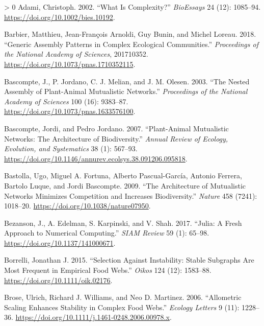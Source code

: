 \documentclass[11pt]{article}
\newlength{\cslhangindent}
\newenvironment{CSLReferences}[3] %
 {%
  \setlength{\parindent}{0pt}
  \ifodd #1 \everypar{\setlength{\hangindent}{\cslhangindent}}\ignorespaces\fi
  \ifnum #2 > 0
  \setlength{\parskip}{#2\baselineskip}
  \fi
 }%
 {}
\begin{document}
\hypertarget{refs}{}
\begin{CSLReferences}{1}{0}
\leavevmode\hypertarget{ref-Adami2002WhaCom}{}%
Adami, Christoph. 2002. {``What Is Complexity?''} \emph{BioEssays} 24
(12): 1085--94. \url{https://doi.org/10.1002/bies.10192}.

\leavevmode\hypertarget{ref-Barbier2018GenAss}{}%
Barbier, Matthieu, Jean-François Arnoldi, Guy Bunin, and Michel Loreau.
2018. {``Generic Assembly Patterns in Complex Ecological Communities.''}
\emph{Proceedings of the National Academy of Sciences}, 201710352.
\url{https://doi.org/10.1073/pnas.1710352115}.

\leavevmode\hypertarget{ref-Bascompte2003NesAss}{}%
Bascompte, J., P. Jordano, C. J. Melian, and J. M. Olesen. 2003. {``The
Nested Assembly of Plant-Animal Mutualistic Networks.''}
\emph{Proceedings of the National Academy of Sciences} 100 (16):
9383--87. \url{https://doi.org/10.1073/pnas.1633576100}.

\leavevmode\hypertarget{ref-Bascompte2007PlaMut}{}%
Bascompte, Jordi, and Pedro Jordano. 2007. {``Plant-Animal Mutualistic
Networks: The Architecture of Biodiversity.''} \emph{Annual Review of
Ecology, Evolution, and Systematics} 38 (1): 567--93.
\url{https://doi.org/10.1146/annurev.ecolsys.38.091206.095818}.

\leavevmode\hypertarget{ref-Bastolla2009ArcMut}{}%
Bastolla, Ugo, Miguel A. Fortuna, Alberto Pascual-García, Antonio
Ferrera, Bartolo Luque, and Jordi Bascompte. 2009. {``The Architecture
of Mutualistic Networks Minimizes Competition and Increases
Biodiversity.''} \emph{Nature} 458 (7241): 1018--20.
\url{https://doi.org/10.1038/nature07950}.

\leavevmode\hypertarget{ref-Bezanson2017JulFre}{}%
Bezanson, J., A. Edelman, S. Karpinski, and V. Shah. 2017. {``Julia: A
Fresh Approach to Numerical Computing.''} \emph{SIAM Review} 59 (1):
65--98. \url{https://doi.org/10.1137/141000671}.

\leavevmode\hypertarget{ref-Borrelli2015SelIns}{}%
Borrelli, Jonathan J. 2015. {``Selection Against Instability: Stable
Subgraphs Are Most Frequent in Empirical Food Webs.''} \emph{Oikos} 124
(12): 1583--88. \url{https://doi.org/10.1111/oik.02176}.

\leavevmode\hypertarget{ref-Brose2006AllSca}{}%
Brose, Ulrich, Richard J. Williams, and Neo D. Martinez. 2006.
{``Allometric Scaling Enhances Stability in Complex Food Webs.''}
\emph{Ecology Letters} 9 (11): 1228--36.
\url{https://doi.org/10.1111/j.1461-0248.2006.00978.x}.


\end{CSLReferences}
\end{document}
